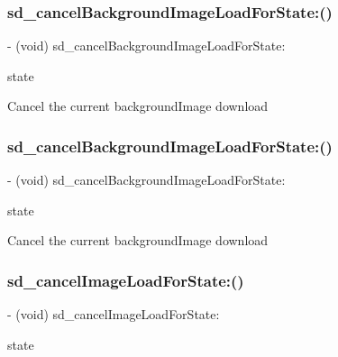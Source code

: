 \subsubsection{\texorpdfstring{sd\+\_\+cancel\+Background\+Image\+Load\+For\+State\+:()}{sd\_cancelBackgroundImageLoadForState:()}\hspace{0.1cm}{\footnotesize\ttfamily [2/3]}}
{\footnotesize\ttfamily -\/ (void) sd\+\_\+cancel\+Background\+Image\+Load\+For\+State\+: \begin{DoxyParamCaption}\item[{(U\+I\+Control\+State)}]{state }\end{DoxyParamCaption}}

Cancel the current background\+Image download \mbox{\label{category_u_i_button_07_web_cache_08_a1212bebc5d1a52a7e898c96fd128191d}} 
\subsubsection{\texorpdfstring{sd\+\_\+cancel\+Background\+Image\+Load\+For\+State\+:()}{sd\_cancelBackgroundImageLoadForState:()}\hspace{0.1cm}{\footnotesize\ttfamily [3/3]}}
{\footnotesize\ttfamily -\/ (void) sd\+\_\+cancel\+Background\+Image\+Load\+For\+State\+: \begin{DoxyParamCaption}\item[{(U\+I\+Control\+State)}]{state }\end{DoxyParamCaption}}

Cancel the current background\+Image download \mbox{\label{category_u_i_button_07_web_cache_08_a29cb6b84260cc685f2b6d7c746a014d8}} 
\subsubsection{\texorpdfstring{sd\+\_\+cancel\+Image\+Load\+For\+State\+:()}{sd\_cancelImageLoadForState:()}\hspace{0.1cm}{\footnotesize\ttfamily [1/3]}}
{\footnotesize\ttfamily -\/ (void) sd\+\_\+cancel\+Image\+Load\+For\+State\+: \begin{DoxyParamCaption}\item[{(U\+I\+Control\+State)}]{state }\end{DoxyParamCaption}}

